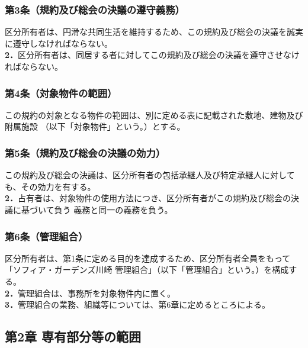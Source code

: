 \documentclass[12pt,uplatex,dvipdfmx]{jsarticle}
\begin{document}
\subsubsection*{ 第3条（規約及び総会の決議の遵守義務）}
区分所有者は、円滑な共同生活を維持するため、この規約及び総会の決議を誠実に遵守しなければならない。\\
\textbf{2．}区分所有者は、同居する者に対してこの規約及び総会の決議を遵守させなければならない。
\subsubsection*{ 第4条（対象物件の範囲）}
この規約の対象となる物件の範囲は、別に定める表に記載された敷地、建物及び附属施設
（以下「対象物件」という。）とする。
\subsubsection*{ 第5条（規約及び総会の決議の効力）}
この規約及び総会の決議は、区分所有者の包括承継人及び特定承継人に対しても、その効力を有する。\\
\textbf{2．}占有者は、対象物件の使用方法につき、区分所有者がこの規約及び総会の決議に基づいて負う
義務と同一の義務を負う。
\subsubsection*{ 第6条（管理組合）}
区分所有者は、第1条に定める目的を達成するため、区分所有者全員をもって「ソフィア・ガーデンズ川崎
管理組合」（以下「管理組合」という。）を構成する。\\
\textbf{2．}管理組合は、事務所を対象物件内に置く。\\
\textbf{3．}管理組合の業務、組織等については、第6章に定めるところによる。\\

\begin{center}
\subsection*{第2章 専有部分等の範囲}
\end{center}
\end{document}
